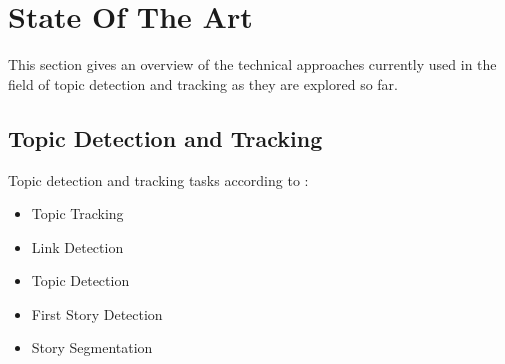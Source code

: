 
\section{State Of The Art}\label{sec:SOTA}

This section gives an overview of the technical approaches currently used in the field of topic detection and tracking as they are explored so far.

\subsection{Topic Detection and Tracking}\label{sec:TDT}
Topic detection and tracking tasks according to \cite{Fiscus:2002:TDT:772260.772263} :
\begin{itemize}
	\item Topic Tracking
	\item Link Detection
	\item Topic Detection
	\item First Story Detection
	\item Story Segmentation
\end{itemize}


